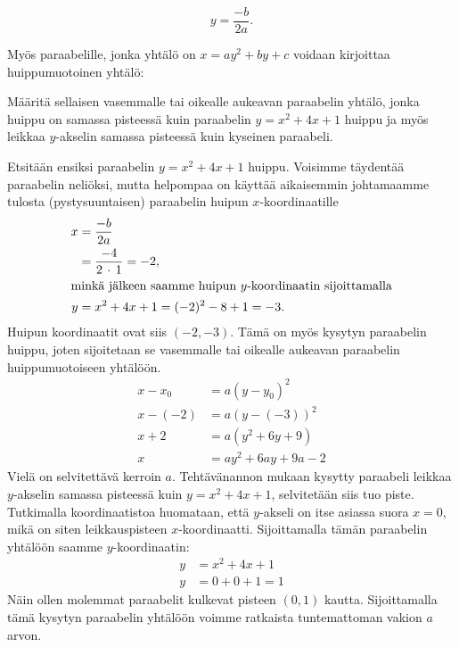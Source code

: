 \[y = \frac{-b}{2a}.\]


Myös paraabelille, jonka yhtälö on $x=ay^2+by+c$ voidaan kirjoittaa huippumuotoinen yhtälö:


\begin{esimerkki}
    Määritä sellaisen vasemmalle tai oikealle aukeavan paraabelin yhtälö, jonka huippu on samassa pisteessä kuin paraabelin $y = x^2 + 4x +1$ huippu ja myös leikkaa $y$-akselin samassa pisteessä kuin kyseinen paraabeli.
    \begin{esimratk} %
        Etsitään ensiksi paraabelin $y = x^2 + 4x +1$ huippu. Voisimme täydentää paraabelin neliöksi, mutta helpompaa on käyttää aikaisemmin johtamaamme tulosta (pystysuuntaisen) paraabelin huipun $x$-koordinaatille
        \begin{align*}
        x &= \frac{-b}{2a} \\
          &= \frac{-4}{2\,\cdot\,1} = -2, \\
        \intertext{minkä jälkeen saamme huipun $y$-koordinaatin sijoittamalla}
        y &= x^2 + 4x +1 = (-2)^2 - 8 +1 = -3.
        \end{align*}
        Huipun koordinaatit ovat siis $(-2, -3)$. Tämä on myös kysytyn paraabelin huippu, joten sijoitetaan se vasemmalle tai oikealle aukeavan paraabelin huippumuotoiseen yhtälöön.
        \begin{align*}
        x-x_0 &= a(y-y_0)^2\\
        x-(-2) &= a(y-(-3))^2 \\
        x +2 &= a(y^2 +6y +9)\\
        x &= ay^2 +6ay +9a -2
        \end{align*}
        Vielä on selvitettävä kerroin $a$. Tehtävänannon mukaan kysytty paraabeli leikkaa $y$-akselin samassa pisteessä kuin $y = x^2 + 4x +1$, selvitetään siis tuo piste. Tutkimalla koordinaatistoa huomataan, että $y$-akseli on itse asiassa suora $x = 0$, mikä on siten leikkauspisteen $x$-koordinaatti. Sijoittamalla tämän paraabelin yhtälöön saamme $y$-koordinaatin:
        \begin{align*}
        y &= x^2 + 4x +1\\
        y &= 0 + 0 + 1 = 1
        \end{align*}
        Näin ollen molemmat paraabelit kulkevat pisteen $(0,1)$ kautta. Sijoittamalla tämä kysytyn paraabelin yhtälöön voimme ratkaista tuntemattoman vakion $a$ arvon.

\end{esimratk}
\end{esimerkki}
